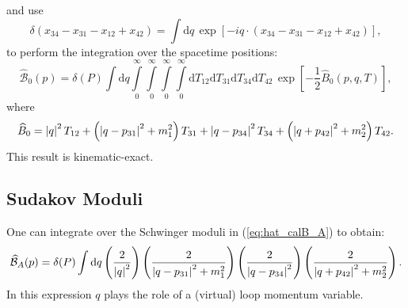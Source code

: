 and use
\begin{equation}
	\delta(x_{34} - x_{31} - x_{12} + x_{42}) = \int \mathrm{d}q \, \exp{\left[-i q \cdot (x_{34} - x_{31} - x_{12} + x_{42}) \right]},
\end{equation}
to perform the integration over the spacetime positions:
\begin{equation}
	\widehat{\mathcal{B}}_{0}(p) = \delta(P) \int \mathrm{d}q \int\limits_{0}^{\infty} \int\limits_{0}^{\infty} \int\limits_{0}^{\infty} \int\limits_{0}^{\infty} \mathrm{d}T_{12} \mathrm{d}T_{31} \mathrm{d}T_{34} \mathrm{d}T_{42} \, \exp{\left[- \frac{1}{2} \widehat{B}_{0}(p, q, T) \right]},
	\label{eq:hat_calB_A}
\end{equation}
where
\begin{equation}
	\widehat{B}_{0} = \left\lvert q \right\rvert^{2} T_{12} + \left(\left\lvert q - p_{31} \right\rvert^{2} + m_{1}^{2} \right) T_{31} + \left\lvert q - p_{34} \right\rvert^{2} T_{34} + \left(\left\lvert q + p_{42} \right\rvert^{2} + m_{2}^{2} \right) T_{42}.
\end{equation}
This result is kinematic-exact.
\subsection{Sudakov Moduli}
One can integrate over the Schwinger moduli in (\ref{eq:hat_calB_A}) to obtain:
\begin{equation}
	\widehat{\mathcal{B}}_{A}(p) = \delta(P) \int \mathrm{d}q \left( \frac{2}{\left\lvert q \right\rvert^{2}} \right) \left( \frac{2}{\left\lvert q - p_{31} \right\rvert^{2} + m_{1}^{2}} \right) \left( \frac{2}{\left\lvert q - p_{34} \right\rvert^{2}} \right) \left( \frac{2}{\left\lvert q + p_{42} \right\rvert^{2} + m_{2}^{2}} \right).
	\label{eq:sudakov_B_A}
\end{equation}
In this expression $q$ plays the role of a (virtual) loop momentum variable.

